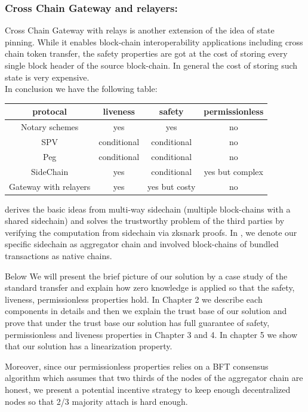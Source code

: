 \documentclass[acmtog, natbib=false]{acmart}
\begin{document}
\subsubsection{Cross Chain Gateway and relayers:}
    Cross Chain Gateway with relays is another extension of the idea of state pinning. While it enables block-chain interoperability applications including cross chain token transfer, the safety properties are got at the cost of storing every single block header of the source block-chain\cite{belchior2021survey}. In general the cost of storing such state is very expensive.
\\
\newline
In conclusion we have the following table:
\begin{table}[h]
\small
\centering
\begin{tabular}{ | c | c | c | c | }
\hline
protocal & liveness & safety & permissionless \\
\hline
Notary schemes & yes & yes & no\\
\hline
SPV & conditional & conditional & no \\
\hline
Peg & conditional & conditional & no \\
\hline
SideChain & yes & conditional & yes but complex \\ 
\hline
Gateway with relayers & yes & yes but costy & no \\ 
\hline
\end{tabular}
\end{table}

\dprotocol derives the basic ideas from multi-way sidechain (multiple block-chains with a shared sidechain) and solves the trustworthy problem of the third parties by verifying the computation from sidechain via zksnark proofs. In \dprotocol, we denote our specific sidechain as aggregator chain and involved block-chains of bundled transactions as native chains.

Below We will present the brief picture of our solution by a case study of the standard transfer and explain how zero knowledge is applied so that the safety, liveness, permissionless properties hold. In Chapter 2 we describe each components in details and then we explain the trust base of our solution and prove that under the trust base our solution has full guarantee of safety, permissionless and liveness properties in Chapter 3 and 4. In chapter 5 we show that our solution has a linearization property. 

Moreover, since our permissionless properties relies on a BFT consensus algorithm which assumes that two thirds of the nodes of the aggregator chain are honest, we present a potential incentive strategy to keep enough decentralized nodes so that 2/3 majority attach is hard enough.
\end{document}
